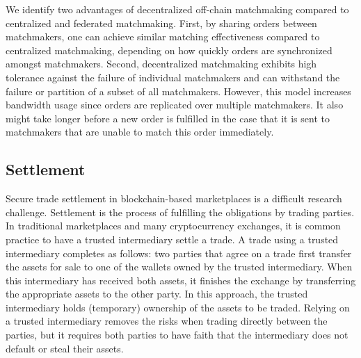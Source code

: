 

We identify two advantages of decentralized off-chain matchmaking compared to centralized and federated matchmaking.
First, by sharing orders between matchmakers, one can achieve similar matching effectiveness compared to centralized matchmaking, depending on how quickly orders are synchronized amongst matchmakers.
Second, decentralized matchmaking exhibits high tolerance against the failure of individual matchmakers and can withstand the failure or partition of a subset of all matchmakers.
However, this model increases bandwidth usage since orders are replicated over multiple matchmakers.
It also might take longer before a new order is fulfilled in the case that it is sent to matchmakers that are unable to match this order immediately.

\subsection{Settlement}
Secure trade settlement in blockchain-based marketplaces is a difficult research challenge.
Settlement is the process of fulfilling the obligations by trading parties.
In traditional marketplaces and many cryptocurrency exchanges, it is common practice to have a trusted intermediary settle a trade.
A trade using a trusted intermediary completes as follows: two parties that agree on a trade first transfer the assets for sale to one of the wallets owned by the trusted intermediary.
When this intermediary has received both assets, it finishes the exchange by transferring the appropriate assets to the other party.
In this approach, the trusted intermediary holds (temporary) ownership of the assets to be traded.
Relying on a trusted intermediary removes the risks when trading directly between the parties, but it requires both parties to have faith that the intermediary does not default or steal their assets.

